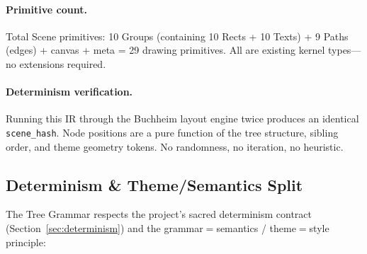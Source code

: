 \paragraph{Primitive count.}
Total Scene primitives: 10 Groups (containing 10 Rects + 10 Texts) + 9 Paths (edges) + canvas + meta = 29 drawing primitives. All are existing kernel types---no extensions required.

\paragraph{Determinism verification.}
Running this IR through the Buchheim layout engine twice produces an identical \texttt{scene\_hash}. Node positions are a pure function of the tree structure, sibling order, and theme geometry tokens. No randomness, no iteration, no heuristic.

\subsection{Determinism \& Theme/Semantics Split}
\label{sec:tree-determinism}

The Tree Grammar respects the project's sacred determinism contract (Section~\ref{sec:determinism}) and the grammar$=$semantics / theme$=$style principle:

